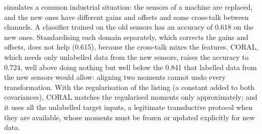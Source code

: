  simulates a common industrial situation: the sensors of a machine are replaced, and the new ones have
different gains and offsets and some cross-talk between channels. A classifier trained on the old sensors has an
accuracy of 0.618 on the new ones. Standardising each domain separately, which corrects the gains and offsets, does not
help (0.615), because the cross-talk mixes the features. CORAL, which needs only unlabelled data from the new sensors,
raises the accuracy to 0.724, well above doing nothing but well below the 0.841 that labelled data from the new sensors
would allow: aligning two moments cannot undo every transformation. With the regularisation of the listing
(a constant added to both covariances), CORAL matches the regularised moments only approximately; and it
uses all the unlabelled target inputs, a legitimate transductive protocol when they are available, whose
moments must be frozen or updated explicitly for new data.


